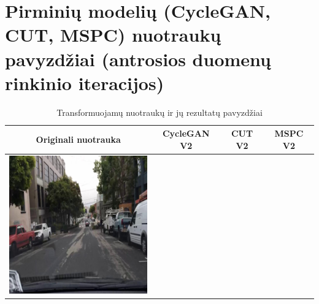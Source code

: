 \documentclass{VUMIFPSbakalaurinis}
\begin{document}
\section{Pirminių modelių (CycleGAN, CUT, MSPC) nuotraukų pavyzdžiai (antrosios duomenų rinkinio iteracijos)}
    \begin{table}[H]
        \footnotesize
        \centering
        \caption{Transformuojamų nuotraukų ir jų rezultatų pavyzdžiai}
        {\begin{tabular}{|c|c|c|c|} \hline
            Originali nuotrauka & CycleGAN V2  & CUT V2  & MSPC V2\\
            \hline
            \includegraphics[scale=0.35]{img/pvz/1_real} & 

\end{tabular}}
\end{table}
\end{document}
